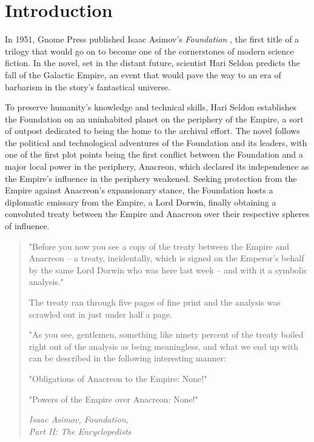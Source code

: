 \section{Introduction}

In 1951, Gnome Press published Isaac Asimov's \emph{Foundation} \citep{asimov1951foundation}, the first title of a trilogy that would go on to become one of the cornerstones of modern science fiction. In the novel, set in the distant future, scientist Hari Seldon predicts the fall of the Galactic Empire, an event that would pave the way to an era of barbarism in the story's fantastical universe.

To preserve humanity's knowledge and technical skills, Hari Seldon establishes the Foundation on an uninhabited planet on the periphery of the Empire, a sort of outpost dedicated to being the home to the archival effort. The novel follows the political and technological adventures of the Foundation and its leaders, with one of the first plot points being the first conflict between the Foundation and a major local power in the periphery, Anacreon, which declared its independence as the Empire's influence in the periphery weakened. Seeking protection from the Empire against Anacreon's expansionary stance, the Foundation hosts a diplomatic emissary from the Empire, a Lord Dorwin, finally obtaining a convoluted treaty between the Empire and Anacreon over their respective spheres of influence.

\begin{quote}
    "Before you now you see a copy of the treaty between the Empire and Anacreon – a treaty, incidentally, which is signed on the Emperor's behalf by the same Lord Dorwin who was here last week – and with it a symbolic analysis."

    The treaty ran through five pages of fine print and the analysis was scrawled out in just under half a page.

    "As you see, gentlemen, something like ninety percent of the treaty boiled right out of the analysis as being meaningless, and what we end up with can be described in the following interesting manner:

    "Obligations of Anacreon to the Empire: None!"

    "Powers of the Empire over Anacreon: None!"

    \vspace{0.2cm}

    \begin{flushright}
        \small \emph{Isaac Asimov, Foundation,\\Part II: The Encyclopedists}
    \end{flushright}
\end{quote}

